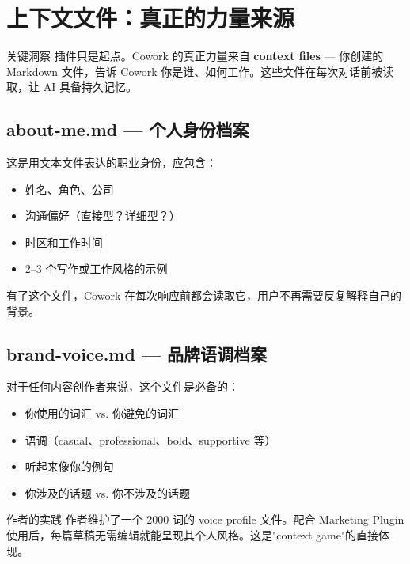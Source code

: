 \section{上下文文件：真正的力量来源}

\begin{importantbox}{关键洞察}
插件只是起点。Cowork 的真正力量来自 \textbf{context files} --- 你创建的 Markdown 文件，告诉 Cowork 你是谁、如何工作。这些文件在每次对话前被读取，让 AI 具备持久记忆。
\end{importantbox}

\subsection{about-me.md --- 个人身份档案}

这是用文本文件表达的职业身份，应包含：

\begin{itemize}
    \item 姓名、角色、公司
    \item 沟通偏好（直接型？详细型？）
    \item 时区和工作时间
    \item 2--3 个写作或工作风格的示例
\end{itemize}

有了这个文件，Cowork 在每次响应前都会读取它，用户不再需要反复解释自己的背景。

\subsection{brand-voice.md --- 品牌语调档案}
\label{sec:brand-voice}

对于任何内容创作者来说，这个文件是必备的：

\begin{itemize}
    \item 你使用的词汇 vs. 你避免的词汇
    \item 语调（casual、professional、bold、supportive 等）
    \item 听起来像你的例句
    \item 你涉及的话题 vs. 你不涉及的话题
\end{itemize}

\begin{knowledgebox}{作者的实践}
作者维护了一个 2000 词的 voice profile 文件。配合 Marketing Plugin 使用后，每篇草稿无需编辑就能呈现其个人风格。这是"context game"的直接体现。
\end{knowledgebox}

